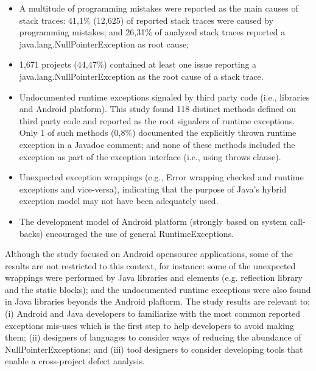 \documentclass[conference]{IEEEtran}
\begin{document}
\begin{itemize}

   \item  A multitude of programming mistakes were reported as the main causes of stack traces:
  41,1\%  (12,625)  of reported stack traces were caused by programming mistakes; and 26,31\% of analyzed stack traces reported a java.lang.NullPointerException as root cause;

   \item 1,671 projects (44,47\%) contained at least one issue reporting a java.lang.NullPointerException as the root cause of a stack trace.

   \item Undocumented runtime exceptions signaled by third party
    code (i.e., libraries and Android platform). This study found 118 distinct methods defined on third party code and  reported as the root signalers of runtime exceptions. Only 1 of such methods (0,8\%) documented the explicitly thrown runtime exception in a Javadoc comment; and none of these methods included the exception as part of the exception interface (i.e., using throws clause).

   \item  Unexpected exception wrappings (e.g., Error wrapping checked and runtime
    exceptions and vice-versa), indicating that the purpose of Java's hybrid exception model may not have been adequately used.

   \item  The development model of Android platform (strongly based on system call-backs) encouraged 
     the use of general RuntimeExceptions.


\end{itemize}

Although the study focused on Android opensource applications, some of the results are not restricted to this context, 
for instance: some of the unexpected wrappings were performed by Java libraries and elements (e.g. reflection library and 
the static blocks); and the undocumented runtime exceptions were also found in Java libraries beyonds the Android plaftorm.
The study results are relevant to: (i) Android and Java developers to familiarize with the most common reported exceptions 
mis-uses which is the first step to help developers to avoid making them; (ii) designers of languages to consider ways of reducing the abundance of NullPointerExceptions; and (iii) tool designers to consider developing tools that enable a cross-project defect analysis.
\end{document}
